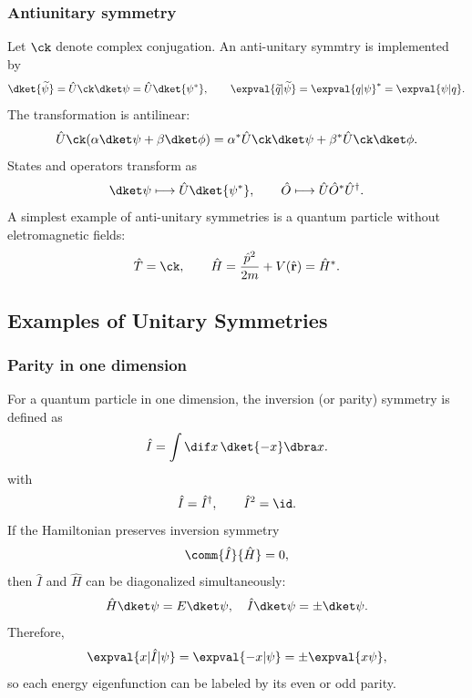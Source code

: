 \subsubsection{Antiunitary symmetry}
Let $\ck$ denote complex conjugation. An anti-unitary symmtry is implemented by 
\begin{equation}
 \dket{\widetilde\psi}=\hat U \ck\dket\psi=\hat U\dket{\psi^\ast},
 \qquad
 \expval{\widetilde q|\widetilde\psi}
 =\expval{q|\psi}^*=\expval{\psi|q}.
\end{equation}
The transformation is antilinear:
\begin{equation}
 \hat U \ck(\alpha\dket\psi+\beta\dket\phi)
 =\alpha^*\hat U\ck\dket\psi
 +\beta^*\hat U\ck\dket\phi.
\end{equation}
States and operators transform as
\begin{equation}
 \dket\psi\longmapsto\hat U\dket{\psi^*},
 \qquad
 \hat O\longmapsto\hat U\hat O^*\hat U^\dagger.
\end{equation}
A simplest example of anti-unitary symmetries is a quantum particle without eletromagnetic fields:
\begin{equation}
 \hat T=\ck,
 \qquad
 \hat H=\frac{\hat p^2}{2m}+V(\hat{\textbf{r}})=\hat H^\ast.
\end{equation}

\subsection{Examples of Unitary Symmetries}

\subsubsection{Parity in one dimension}
For a quantum particle in one dimension, the inversion (or parity) symmetry is defined as 
\begin{equation}
 \hat I=\int\dif x\,\dket{-x}\dbra x.
\end{equation}
with 
\begin{equation}
 \hat I=\hat I^\dagger,
 \qquad
 \hat I^2=\id.
\end{equation}
If the Hamiltonian preserves inversion symmetry
\begin{equation}
 \comm{\hat I}{\hat H}=0,
\end{equation}
then $\hat I$ and $\hat H$ can be diagonalized simultaneously:
\begin{equation}
\hat H\dket\psi=E\dket\psi,~~~\hat I\dket\psi=\pm\dket\psi.
\end{equation}
Therefore,
\begin{equation}
 \expval{x|\hat I|\psi}=\expval{-x|\psi}
 =\pm\expval{x\psi},
\end{equation}
so each energy eigenfunction can be labeled by its even or odd parity.

